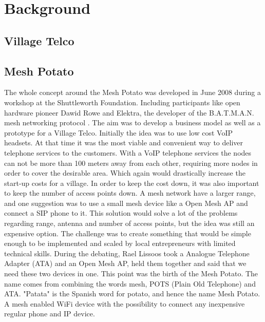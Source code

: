\chapter{Background}
\label{chp:background} 

\section{Village Telco}

\section{Mesh Potato}



The whole concept around the Mesh Potato was developed in June 2008 during a workshop at the Shuttleworth Foundation. Including participants like open hardware pioneer Dawid Rowe and Elektra, the developer of the B.A.T.M.A.N. mesh networking protocol \cite{MPworkshop}. The aim was to develop a business model as well as a prototype for a Village Telco. Initially the idea was to use low cost VoIP headsets. At that time it was the most viable and convenient way to deliver telephone services to the customers. With a VoIP telephone services the nodes can not be more than 100 meters away from each other, requiring more nodes in order to cover the desirable area. Which again would drastically increase the start-up costs for a village. In order to keep the cost down, it was also important to keep the number of access points down. A mesh network have a larger range, and one suggestion was to use a small mesh device like a Open Mesh AP and connect a SIP phone to it. This solution would solve a lot of the problems regarding range, antenna and number of access points, but the idea was still an expensive option. The challenge was to create something that would be simple enough to be implemented and scaled by local entrepreneurs with limited technical skills. 
During the debating, Rael Lissoos took a Analogue Telephone Adapter (ATA) and an Open Mesh AP, held them together and said that we need these two devices in one. This point was the birth of the Mesh Potato. The name comes from combining the words mesh, POTS (Plain Old Telephone) and ATA. "Patata" is the Spanish word for potato, and hence the name Mesh Potato. A mesh enabled WiFi device with the possibility to connect any inexpensive regular phone and IP device. \cite{MPorigin}

